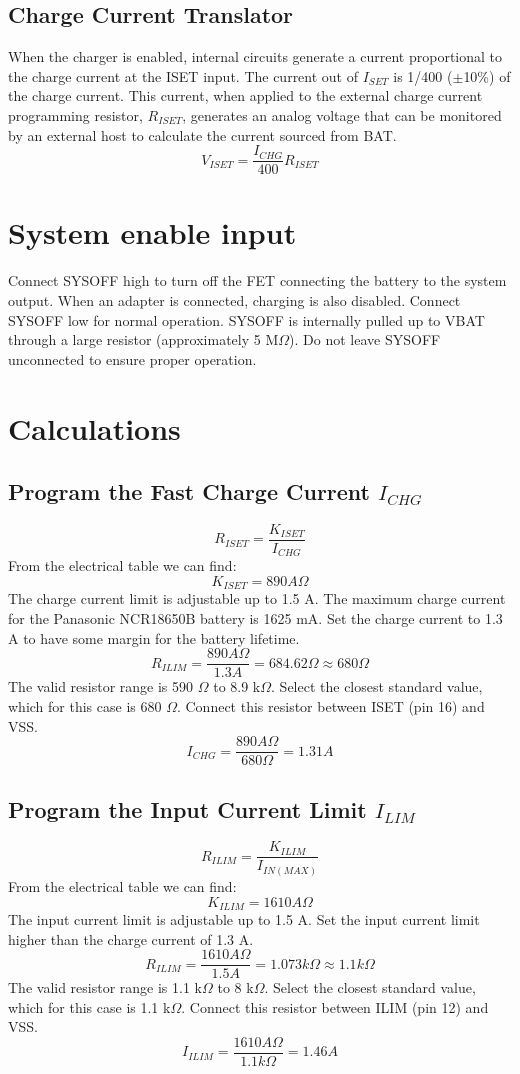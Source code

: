 \documentclass{article}
\begin{document}
\subsection{Charge Current Translator}
When the charger is enabled, internal circuits generate a current proportional to the charge current at the ISET input. The current out of $I_{SET}$ is 1/400 ($\pm$10\%) of the charge current. This current, when applied to the external charge current programming resistor, $R_{ISET}$, generates an analog voltage that can be monitored by an external host to calculate the current sourced from BAT.
\[ V_{ISET} = \frac{I_{CHG}}{400} R_{ISET} \]

\section{System enable input}
Connect SYSOFF high to turn off the FET connecting the battery to the system output. When an adapter is connected, charging is also disabled. Connect SYSOFF low for normal operation. SYSOFF is internally pulled up to VBAT through a large resistor (approximately 5 M$\Omega$). Do not leave SYSOFF unconnected to ensure proper operation.

\section{Calculations}
\subsection{Program the Fast Charge Current $I_{CHG}$}
\[ R_{ISET} = \frac{K_{ISET}}{I_{CHG}} \]
From the electrical table we can find:
\[ K_{ISET} = 890 A\Omega \]
The charge current limit is adjustable up to 1.5 A. The maximum charge current for the Panasonic NCR18650B battery is 1625 mA. Set the charge current to 1.3 A to have some margin for the battery lifetime.
\[ R_{ILIM} = \frac{890 A\Omega}{1.3 A} = 684.62 \Omega \approx 680 \Omega \]
The valid resistor range is 590 $\Omega$ to 8.9 k$\Omega$. Select the closest standard value, which for this case is 680 $\Omega$. Connect this resistor between ISET (pin 16) and VSS.
\[ I_{CHG} = \frac{890 A\Omega}{680 \Omega} = 1.31 A \]

\subsection{Program the Input Current Limit $I_{LIM}$}
\[ R_{ILIM} = \frac{K_{ILIM}}{I_{IN(MAX)}} \]
From the electrical table we can find:
\[ K_{ILIM} = 1610 A\Omega \]
The input current limit is adjustable up to 1.5 A. Set the input current limit higher than the charge current of 1.3 A.
\[ R_{ILIM} = \frac{1610 A\Omega}{1.5 A} = 1.073 k\Omega \approx 1.1 k\Omega  \]
The valid resistor range is 1.1 k$\Omega$ to 8 k$\Omega$. Select the closest standard value, which for this case is 1.1 k$\Omega$. Connect this resistor between ILIM (pin 12) and VSS.
\[ I_{ILIM} = \frac{1610 A\Omega}{1.1 k\Omega} = 1.46 A \]
\end{document}
